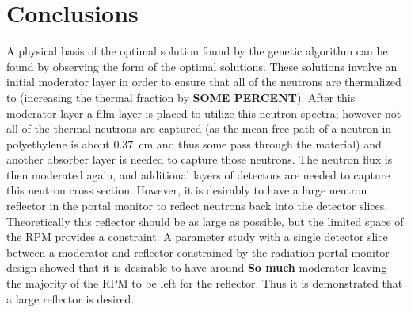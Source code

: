 

\section{Conclusions}

A physical basis of the optimal solution found by the genetic algorithm can be found by observing the form of the optimal solutions.
These solutions involve an initial moderator layer in order to ensure that all of the neutrons are thermalized to (increasing the thermal fraction by \textbf{SOME PERCENT}).
After this moderator layer a film layer is placed to utilize this neutron spectra; however not all of the thermal neutrons are captured (as the mean free path of a neutron in polyethylene is about \SI{0.37}{\cm} and thus some pass through the material) and another absorber layer is needed to capture those neutrons.  
The neutron flux is then moderated again, and additional layers of detectors are needed to capture this neutron cross section.
However, it is desirably to have a large neutron reflector in the portal monitor to reflect neutrons back into the detector slices. 
Theoretically this reflector should be as large as possible, but the limited space of the RPM provides a constraint.
A parameter study with a single detector slice between a moderator and reflector constrained by the radiation portal monitor design showed that it is desirable to have around \textbf{So much} moderator leaving the majority of the RPM to be left for the reflector.
Thus it is demonstrated that a large reflector is desired.

